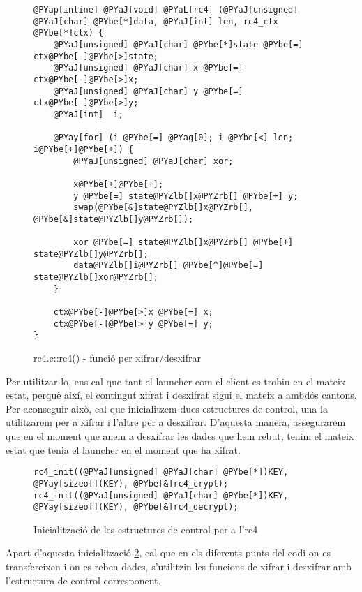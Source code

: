 \begin{figure}[htp]
\begin{Verbatim}[commandchars=@\[\]]
@PYap[inline] @PYaJ[void] @PYaL[rc4] (@PYaJ[unsigned] @PYaJ[char] @PYbe[*]data, @PYaJ[int] len, rc4_ctx @PYbe[*]ctx) {
    @PYaJ[unsigned] @PYaJ[char] @PYbe[*]state @PYbe[=] ctx@PYbe[-]@PYbe[>]state;
    @PYaJ[unsigned] @PYaJ[char] x @PYbe[=] ctx@PYbe[-]@PYbe[>]x;
    @PYaJ[unsigned] @PYaJ[char] y @PYbe[=] ctx@PYbe[-]@PYbe[>]y;
    @PYaJ[int]  i;
    
    @PYay[for] (i @PYbe[=] @PYag[0]; i @PYbe[<] len; i@PYbe[+]@PYbe[+]) {
        @PYaJ[unsigned] @PYaJ[char] xor;
    
        x@PYbe[+]@PYbe[+];
        y @PYbe[=] state@PYZlb[]x@PYZrb[] @PYbe[+] y;
        swap(@PYbe[&]state@PYZlb[]x@PYZrb[], @PYbe[&]state@PYZlb[]y@PYZrb[]);
    
        xor @PYbe[=] state@PYZlb[]x@PYZrb[] @PYbe[+] state@PYZlb[]y@PYZrb[];
        data@PYZlb[]i@PYZrb[] @PYbe[^]@PYbe[=] state@PYZlb[]xor@PYZrb[];
    }
    
    ctx@PYbe[-]@PYbe[>]x @PYbe[=] x;
    ctx@PYbe[-]@PYbe[>]y @PYbe[=] y;
}
\end{Verbatim}

    \caption{rc4.c::rc4() - funció per xifrar/desxifrar}
    \label{fig:rc4_rc4}
\end{figure}

Per utilitzar-lo, ens cal que tant el launcher com el client es trobin en el mateix estat, perquè així,
el contingut xifrat i desxifrat sigui el mateix a ambdós cantons. Per aconseguir això, cal que inicialitzem
dues estructures de control, una la utilitzarem per a xifrar i l'altre per a desxifrar. D'aquesta manera, 
assegurarem que en el moment que anem a desxifrar les dades que hem rebut, tenim el mateix estat que tenia el 
launcher en el moment que ha xifrat.

\begin{figure}[htp]
\begin{Verbatim}[commandchars=@\[\]]
rc4_init((@PYaJ[unsigned] @PYaJ[char] @PYbe[*])KEY, @PYay[sizeof](KEY), @PYbe[&]rc4_crypt);
rc4_init((@PYaJ[unsigned] @PYaJ[char] @PYbe[*])KEY, @PYay[sizeof](KEY), @PYbe[&]rc4_decrypt);
\end{Verbatim}
    \caption{Inicialització de les estructures de control per a l'rc4}
    \label{fig:rc4_inits}
\end{figure}

Apart d'aquesta inicialització \ref{fig:rc4_inits}, cal que en els diferents punts del codi on es transfereixen i on es reben 
dades, s'utilitzin les funcions de xifrar i desxifrar amb l'estructura de control corresponent. \\


